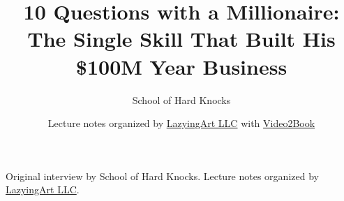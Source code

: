 \documentclass[11pt,oneside]{book}
\begin{document}
\frontmatter
\title{10 Questions with a Millionaire: The Single Skill That Built His \$100M Year Business}
\author{School of Hard Knocks}
\date{Lecture notes organized by \href{https://lazying.art}{LazyingArt LLC} with \href{https://github.com/lachlanchen/Video2Book}{Video2Book}}
\maketitle
\begin{center}
\small Original interview by School of Hard Knocks. Lecture notes organized by \href{https://lazying.art}{LazyingArt LLC}.
\end{center}
\clearpage
\mainmatter

\end{document}
